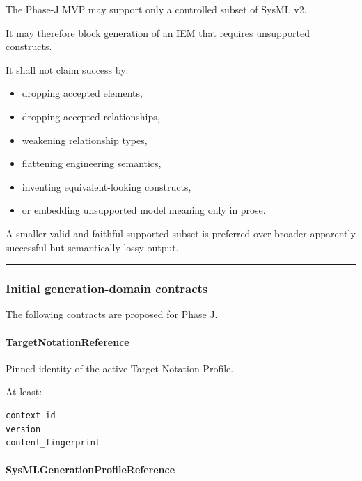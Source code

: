 The Phase-J MVP may support only a controlled subset of SysML v2.

It may therefore block generation of an IEM that requires unsupported constructs.

It shall not claim success by:

\begin{itemize}
\tightlist
\item
  dropping accepted elements,
\item
  dropping accepted relationships,
\item
  weakening relationship types,
\item
  flattening engineering semantics,
\item
  inventing equivalent-looking constructs,
\item
  or embedding unsupported model meaning only in prose.
\end{itemize}

A smaller valid and faithful supported subset is preferred over broader apparently successful but semantically lossy output.

\begin{center}\rule{0.5\linewidth}{0.5pt}\end{center}

\hypertarget{initial-generation-domain-contracts}{%
\subsubsection{Initial generation-domain contracts}\label{initial-generation-domain-contracts}}

The following contracts are proposed for Phase J.

\hypertarget{targetnotationreference}{%
\paragraph{TargetNotationReference}\label{targetnotationreference}}

Pinned identity of the active Target Notation Profile.

At least:

\begin{verbatim}
context_id
version
content_fingerprint
\end{verbatim}

\hypertarget{sysmlgenerationprofilereference}{%
\paragraph{SysMLGenerationProfileReference}\label{sysmlgenerationprofilereference}}

